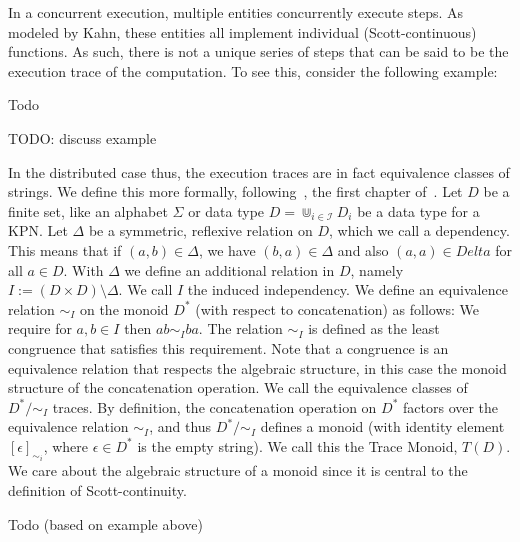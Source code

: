 In a concurrent execution, multiple entities concurrently execute steps.
As modeled by Kahn, these entities all implement individual (Scott-continuous) functions.
As such, there is not a unique series of steps that can be said to be the execution trace of the computation.
To see this, consider the following example:
\begin{ex}
  Todo
\end{ex}

TODO: discuss example

In the distributed case thus, the execution traces are in fact equivalence classes of strings.
We define this more formally, following~\cite{mazurkiewicz1995introduction}, the first chapter of~\cite{diekert1995book}.
Let $D$ be a finite set, like an alphabet $\Sigma$ or data type $D = \Cup_{i \in \mathcal{I}} D_i$ be a data type for a \ac{KPN}.
Let $\Delta$ be a symmetric, reflexive relation on $D$, which we call a dependency.
This means that if $(a,b) \in \Delta$, we have $(b,a) \in \Delta$ and also $(a,a) \in Delta$ for all $a \in D$. 
With $\Delta$ we define an additional relation in $D$, namely $I := (D \times D) \setminus \Delta$.
We call $I$ the induced independency. 
We define an equivalence relation $\sim_I$ on the monoid $D^*$ (with respect to concatenation) as follows:
We require for $a,b \in I$ then $ab \sim_I ba$. The relation $\sim_I$ is defined as the least congruence that satisfies this requirement.
Note that a congruence is an equivalence relation that respects the algebraic structure, in this case the monoid structure of the concatenation operation.
We call the equivalence classes of $D^*/{\sim_I}$ traces. 
By definition, the concatenation operation on $D^*$ factors over the equivalence relation $\sim_I$,
and thus $D^*/{\sim_I}$ defines a monoid (with identity element $[\epsilon]_{\sim_i}$, where $\epsilon \in D^*$ is the empty string).
We call this the Trace Monoid, $T(D)$.
We care about the algebraic structure of a monoid since it is central to the definition of Scott-continuity.

\begin{ex}
  Todo (based on example above)
\end{ex}

